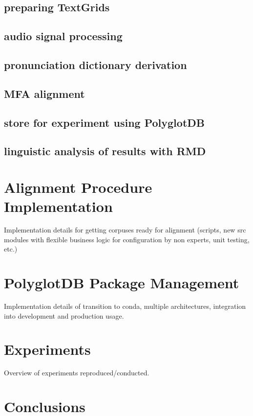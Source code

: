 \documentclass[twoside,11pt]{article}
\begin{document}
\subsection{preparing TextGrids}
\subsection{audio signal processing}
\subsection{pronunciation dictionary derivation}
\subsection{MFA alignment}
\subsection{store for experiment using PolyglotDB}
\subsection{linguistic analysis of results with RMD}


\section{Alignment Procedure Implementation}

Implementation details for getting corpuses ready for alignment (scripts, new src modules with flexible business logic for configuration by non experts, unit testing, etc.)

\section{PolyglotDB Package Management}

Implementation details of transition to conda, multiple architectures, integration into development and production usage.

\section{Experiments}

Overview of experiments reproduced/conducted.

\section{Conclusions}
\end{document}
